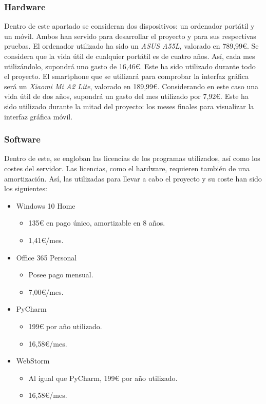 \subsubsection{Hardware}
Dentro de este apartado se consideran dos dispositivos: un ordenador portátil y un móvil. Ambos han servido para desarrollar el proyecto y para sus respectivas pruebas.
El ordenador utilizado ha sido un \textit{ASUS A55L}, valorado en 789,99€. Se considera que la vida útil de cualquier portátil es de cuatro años. Así, cada mes utilizándolo, supondrá uno gasto de 16,46€. Este ha sido utilizado durante todo el proyecto.
El smartphone que se utilizará para comprobar la interfaz gráfica será un \textit{Xiaomi Mi A2 Lite}, valorado en 189,99€. Considerando en este caso una vida útil de dos años, supondrá un gasto del mes utilizado por 7,92€. Este ha sido utilizado durante la mitad del proyecto: los meses finales para visualizar la interfaz gráfica móvil.

\subsubsection{Software}
Dentro de este, se engloban las licencias de los programas utilizados, así como los costes del servidor.
Las licencias, como el hardware, requieren también de una amortización. Así, las utilizadas para llevar a cabo el proyecto y su coste han sido los siguientes:
\begin{itemize}
    \item Windows 10 Home
    \begin{itemize}
        \item 135€ en pago único, amortizable en 8 años.
        \item 1,41€/mes.
    \end{itemize}
    \item Office 365 Personal
    \begin{itemize}
        \item Posee pago mensual.
        \item 7,00€/mes.
    \end{itemize}
    \item PyCharm
    \begin{itemize}
        \item 199€ por año utilizado.
        \item 16,58€/mes.
    \end{itemize}
    \item WebStorm
    \begin{itemize}
        \item Al igual que PyCharm, 199€ por año utilizado.
        \item 16,58€/mes.
    \end{itemize}
\end{itemize}


